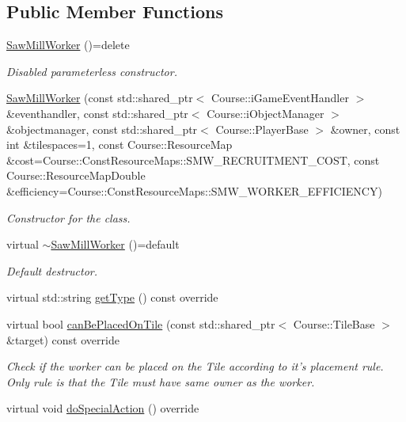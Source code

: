 \subsection*{Public Member Functions}
\begin{DoxyCompactItemize}
\item 
\hypertarget{classSawMillWorker_abbeea20b2931742345a16e018452ac37}{\hyperlink{classSawMillWorker_abbeea20b2931742345a16e018452ac37}{Saw\-Mill\-Worker} ()=delete}\label{classSawMillWorker_abbeea20b2931742345a16e018452ac37}

\begin{DoxyCompactList}\small\item\em Disabled parameterless constructor. \end{DoxyCompactList}\item 
\hyperlink{classSawMillWorker_a62f73bad7839921c7f81acc989935f16}{Saw\-Mill\-Worker} (const std\-::shared\-\_\-ptr$<$ Course\-::i\-Game\-Event\-Handler $>$ \&eventhandler, const std\-::shared\-\_\-ptr$<$ Course\-::i\-Object\-Manager $>$ \&objectmanager, const std\-::shared\-\_\-ptr$<$ Course\-::\-Player\-Base $>$ \&owner, const int \&tilespaces=1, const Course\-::\-Resource\-Map \&cost=Course\-::\-Const\-Resource\-Maps\-::\-S\-M\-W\-\_\-\-R\-E\-C\-R\-U\-I\-T\-M\-E\-N\-T\-\_\-\-C\-O\-S\-T, const Course\-::\-Resource\-Map\-Double \&efficiency=Course\-::\-Const\-Resource\-Maps\-::\-S\-M\-W\-\_\-\-W\-O\-R\-K\-E\-R\-\_\-\-E\-F\-F\-I\-C\-I\-E\-N\-C\-Y)
\begin{DoxyCompactList}\small\item\em Constructor for the class. \end{DoxyCompactList}\item 
\hypertarget{classSawMillWorker_a3c3880751e315614208a223b51c0a7f5}{virtual \hyperlink{classSawMillWorker_a3c3880751e315614208a223b51c0a7f5}{$\sim$\-Saw\-Mill\-Worker} ()=default}\label{classSawMillWorker_a3c3880751e315614208a223b51c0a7f5}

\begin{DoxyCompactList}\small\item\em Default destructor. \end{DoxyCompactList}\item 
virtual std\-::string \hyperlink{classSawMillWorker_adbcb7661f62cd897ba4924e06fddf1da}{get\-Type} () const override
\item 
virtual bool \hyperlink{classSawMillWorker_a839745a456a32530ebfd46ce9bc740e8}{can\-Be\-Placed\-On\-Tile} (const std\-::shared\-\_\-ptr$<$ Course\-::\-Tile\-Base $>$ \&target) const override
\begin{DoxyCompactList}\small\item\em Check if the worker can be placed on the Tile according to it's placement rule. Only rule is that the Tile must have same owner as the worker. \end{DoxyCompactList}\item 
\hypertarget{classSawMillWorker_ae73544e22428a6148669d4a88da259b1}{virtual void \hyperlink{classSawMillWorker_ae73544e22428a6148669d4a88da259b1}{do\-Special\-Action} () override}\label{classSawMillWorker_ae73544e22428a6148669d4a88da259b1}


\end{DoxyCompactItemize}
